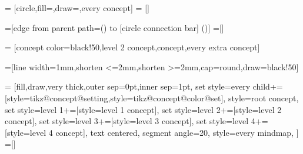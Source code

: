 

\def\tikz@compute@rotation{%
  \pgf@process{\pgfpointnormalised{\pgfpointdiff{\pgfpointanchor{\tikztostart}{center}}{\pgfpointanchor{\tikztotarget}{center}}}}%
  \pgf@ya=-\pgf@y%
  \edef\pgf@marshal{%
    \noexpand\pgfsetadditionalshadetransform{%
      \noexpand\pgftransformcm
      {\pgf@sys@tonumber{\pgf@x}}{\pgf@sys@tonumber{\pgf@y}}%
      {\pgf@sys@tonumber{\pgf@ya}}{\pgf@sys@tonumber{\pgf@x}}%
      {\noexpand\pgfpointorigin}%
    }%
  }%
  \pgf@marshal%
}





=          [circle,fill=\tikz@concept@color,draw=\tikz@concept@color,every concept]
=    []

\def\tikz@concept@color{black}

=[edge from parent path={(\tikzparentnode) to [circle connection bar] (\tikzchildnode)}]
=[]


=     [concept color=black!50,level 2 concept,concept,every extra concept]

=[line width=1mm,shorten <=2mm,shorten >=2mm,cap=round,draw=black!50]



=
  [fill,draw,very thick,outer sep=0pt,inner sep=1pt,%
   set style={{every child}+=[style=tikz@concept@setting,style=tikz@concept@color@set]},%
   style=root concept,
   set style={{level 1}+=[style=level 1 concept]},
   set style={{level 2}+=[style=level 2 concept]},
   set style={{level 3}+=[style=level 3 concept]},
   set style={{level 4}+=[style=level 4 concept]},
   text centered,%
   segment angle=20,
   style=every mindmap,
  ]
=[]


